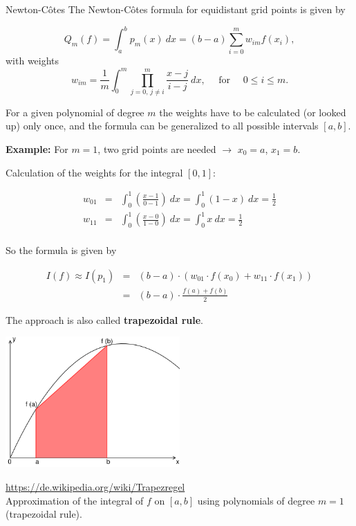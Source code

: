 \documentclass[11pt,compress,t,notes=noshow, xcolor=table]{beamer}
\begin{document}
\begin{vbframe}{Newton-C\^{o}tes}
The Newton-C\^{o}tes formula for equidistant grid points is given by

$$
Q_m(f) = \int_a^b p_m(x)~dx = (b - a)\sum_{i = 0}^m w_{im} f(x_i),
$$
with weights
$$
w_{im} = \frac{1}{m} \int_0^m \prod_{j = 0,\, j \not= i}^m \frac{x - j}{i - j} ~ dx,
  \quad \text{ for } \quad 0 \leq i \leq m.
$$

For a given polynomial of degree $m$ the weights have to be calculated (or looked up) only once, and the formula can be generalized to all possible intervals $[a, b]$.

\framebreak

\textbf{Example:} For $m = 1$, two grid points are needed $\to$ $x_0 = a$, $x_1 = b$.

\vspace{0.2cm}

Calculation of the weights for the integral $[0, 1]$:

\vspace*{-0.3cm}

\begin{eqnarray*}
w_{01} &=& \int_0^1 \left( \frac{x - 1}{0 - 1} \right)~dx = \int_0^1 (1 - x)~dx = \frac{1}{2} \\
w_{11} &=& \int_0^1 \left( \frac{x - 0}{1 - 0} \right)~dx = \int_0^1 x~dx = \frac{1}{2} \\[0.3cm]
\end{eqnarray*}

\vspace*{-0.3cm}

So the formula is given by

\vspace*{-0.2cm}

\begin{eqnarray*}
I(f) \approx I(p_1) &=& (b - a)\cdot (w_{01} \cdot f(x_0) +  w_{11} \cdot f(x_1))  \\
&=& (b - a)  \cdot \frac{f(a) + f(b)}{2}
\end{eqnarray*}


\framebreak

The approach is also called \textbf{trapezoidal rule}.

\begin{center}
\includegraphics[width=0.5\textwidth]{figure_man/trapezregel.png}
\begin{footnotesize}
\url{https://de.wikipedia.org/wiki/Trapezregel}\\
Approximation of the integral of $f$ on $[a, b]$ using polynomials of degree $m = 1$ (trapezoidal rule).
\end{footnotesize}
\end{center}

\end{vbframe}
\end{document}

